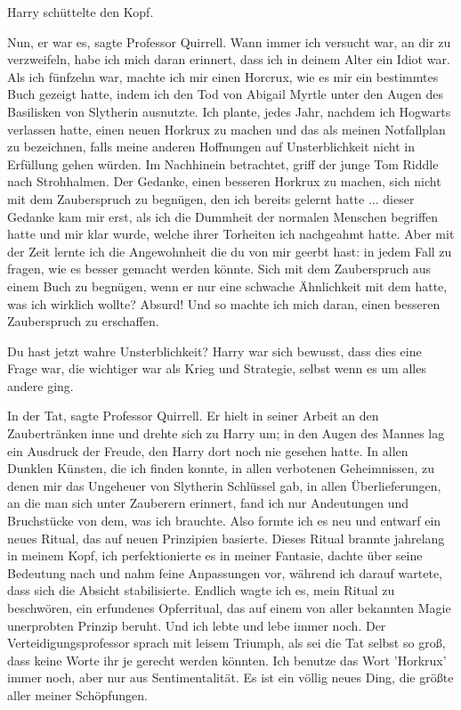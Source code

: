 Harry schüttelte den Kopf.

\glqq Nun, er war es\grqq{}, sagte Professor Quirrell. \glqq Wann immer ich
versucht war, an dir zu verzweifeln, habe ich mich daran erinnert, dass ich in
deinem Alter ein Idiot war. Als ich fünfzehn war, machte ich mir einen Horcrux,
wie es mir ein bestimmtes Buch gezeigt hatte, indem ich den Tod von Abigail
Myrtle unter den Augen des Basilisken von Slytherin ausnutzte. Ich plante, jedes
Jahr, nachdem ich Hogwarts verlassen hatte, einen neuen Horkrux zu machen und
das als meinen Notfallplan zu bezeichnen, falls meine anderen Hoffnungen auf
Unsterblichkeit nicht in Erfüllung gehen würden. Im Nachhinein betrachtet, griff
der junge Tom Riddle nach Strohhalmen. Der Gedanke, einen besseren Horkrux zu
machen, sich nicht mit dem Zauberspruch zu begnügen, den ich bereits gelernt
hatte ... dieser Gedanke kam mir erst, als ich die Dummheit der normalen
Menschen begriffen hatte und mir klar wurde, welche ihrer Torheiten ich
nachgeahmt hatte. Aber mit der Zeit lernte ich die Angewohnheit die du von mir
geerbt hast: in jedem Fall zu fragen, wie es besser gemacht werden könnte. Sich
mit dem Zauberspruch aus einem Buch zu begnügen, wenn er nur eine schwache
Ähnlichkeit mit dem hatte, was ich wirklich wollte? Absurd! Und so machte ich
mich daran, einen besseren Zauberspruch zu erschaffen.\grqq{}

\glqq Du hast jetzt wahre Unsterblichkeit?\grqq{} Harry war sich bewusst, dass
dies eine Frage war, die wichtiger war als Krieg und Strategie, selbst wenn es
um alles andere ging.

\glqq In der Tat\grqq{}, sagte Professor Quirrell. Er hielt in seiner Arbeit an
den Zaubertränken inne und drehte sich zu Harry um; in den Augen des Mannes lag
ein Ausdruck der Freude, den Harry dort noch nie gesehen hatte. \glqq In allen
Dunklen Künsten, die ich finden konnte, in allen verbotenen Geheimnissen, zu
denen mir das Ungeheuer von Slytherin Schlüssel gab, in allen Überlieferungen,
an die man sich unter Zauberern erinnert, fand ich nur Andeutungen und
Bruchstücke von dem, was ich brauchte. Also formte ich es neu und entwarf ein
neues Ritual, das auf neuen Prinzipien basierte. Dieses Ritual brannte jahrelang
in meinem Kopf, ich perfektionierte es in meiner Fantasie, dachte über seine
Bedeutung nach und nahm feine Anpassungen vor, während ich darauf wartete, dass
sich die Absicht stabilisierte. Endlich wagte ich es, mein Ritual zu beschwören,
ein erfundenes Opferritual, das auf einem von aller bekannten Magie unerprobten
Prinzip beruht. Und ich lebte und lebe immer noch.\grqq{} Der
Verteidigungsprofessor sprach mit leisem Triumph, als sei die Tat selbst so
groß, dass keine Worte ihr je gerecht werden könnten. \glqq Ich benutze das Wort
'Horkrux' immer noch, aber nur aus Sentimentalität. Es ist ein völlig neues
Ding, die größte aller meiner Schöpfungen.\grqq{}


